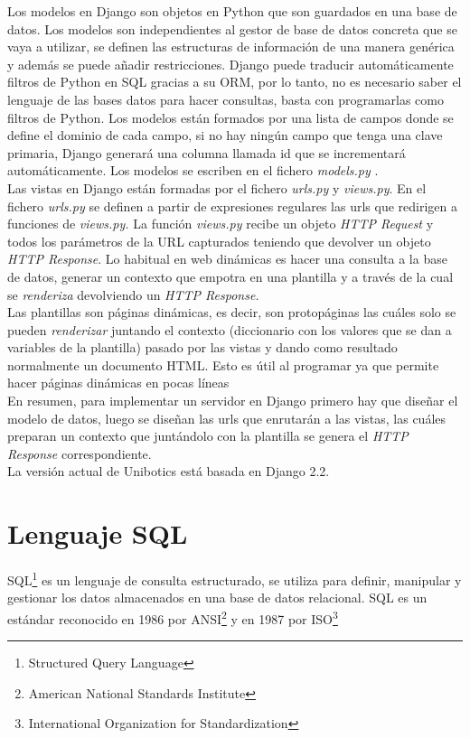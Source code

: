 Los modelos en Django son objetos en Python que son guardados en una base de datos. Los modelos son independientes al gestor de base de datos concreta que se vaya a utilizar, se definen las estructuras de información de una manera genérica y además se puede añadir restricciones. Django puede traducir automáticamente filtros de Python en SQL gracias a su ORM, por lo tanto, no es necesario saber el lenguaje de las bases datos para hacer consultas, basta con programarlas como ﬁltros de Python. Los modelos están formados por una lista de campos donde se define el dominio de cada campo, si no hay ningún campo que tenga una clave primaria, Django generará una columna llamada id que se incrementará automáticamente. Los modelos se escriben en el fichero \textit{models.py} \cite{model}.\\

Las vistas en Django están formadas por el fichero \textit{urls.py} y \textit{views.py}. En el fichero\textit{ urls.py} se definen a partir de expresiones regulares las urls que redirigen a funciones de \textit{views.py.} La función \textit{views.py} recibe un objeto \textit{HTTP Request} y todos los parámetros de la URL capturados teniendo que devolver un objeto \textit{HTTP Response}. Lo habitual en web dinámicas es hacer una consulta a la base de datos, generar un contexto que empotra en una plantilla y a través de la cual se \textit{renderiza} devolviendo un \textit{HTTP Response.}\\

Las plantillas son páginas dinámicas, es decir, son protopáginas las cuáles solo se pueden \textit{renderizar} juntando el contexto (diccionario con los valores que se dan a variables de la plantilla) pasado por las vistas y dando como resultado normalmente un documento HTML. Esto es útil al programar ya que permite hacer páginas dinámicas en pocas líneas\\
\newpage
En resumen, para implementar un servidor en Django primero hay que diseñar el modelo de datos, luego se diseñan las urls que enrutarán a las vistas, las cuáles preparan un contexto que juntándolo con la plantilla se genera el \textit{HTTP Response} correspondiente.\\

La versión actual de Unibotics está basada en Django 2.2.

\section{Lenguaje SQL}
SQL\footnote{Structured Query Language} es un lenguaje de consulta estructurado, se utiliza para definir, manipular y gestionar los datos almacenados en una base de datos relacional. SQL es un estándar reconocido en 1986 por ANSI\footnote{American National Standards Institute} y en 1987 por ISO\footnote{International Organization for Standardization}\\

